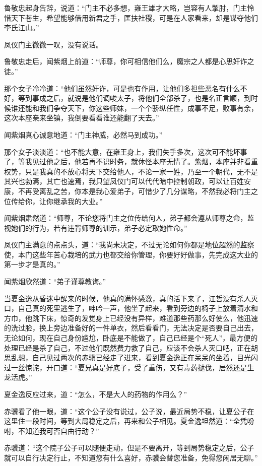 鲁敬忠起身告辞，说道：“门主不必多想，雍王雄才大略，岂容有人掣肘，门主怜惜天下苍生，希望能够借用新君之手，匡扶社稷，可是在人家看来，却是谋夺他们李氏江山。”

凤仪门主微微一叹，没有说话。

鲁敬忠走后，闻紫烟上前道：“师尊，你可相信他们么，魔宗之人都是心思奸诈之徒。”

那个女子冷冷道：“他们虽然奸诈，可是也有作用，让他们多担些恶名有什么不好，等到事成之后，就说是他们调唆太子，将他们全部杀了，也是名正言顺，到时候谁还能和我们争夺天下，你这些师妹，一个个骄纵任性，成事不足，败事有余，这次本座亲来坐镇，我倒要看看谁还能翻了天去。”

闻紫烟真心诚意地道：“门主神威，必然马到成功。”

那个女子淡淡道：“也不能大意，在雍王身上，我们失手多次，这次可不能坏事了，等我见过他之后，他若再不识时务，就休怪本座无情了。紫烟，本座并非看重权势，只是我真的不放心将天下交给他人，不论一家一姓，乃至一个朝代，无不是其兴也勃焉，其亡也速焉，我只望凤仪门可以代代暗中控制朝政，可以让百姓安康，不再受离乱之苦，你本是我心爱弟子，可惜少了几分谋略，不然我必将门主之位传给你，让你继承我的大业。”

闻紫烟肃然道：“师尊，不论您将门主之位传给何人，弟子都会遵从师尊之命，监视她们的行为，若有违背师尊的训示，弟子必定取她性命。”

凤仪门主满意的点点头，道：“我尚未决定，不过无论如何你都是地位超然的监察使，本门这些年苦心栽培的武力也都交给你管理，你要好好做事，先完成这大业的第一步才是真的。”

闻紫烟欣然道：“弟子谨尊教诲。”

当夏金逸从昏迷中醒来的时候，他真的满怀感激，真的活下来了，江哲没有杀人灭口，自己真的死里逃生了，呻吟一声，他坐了起来，看到旁边的椅子上放着清水和方巾，他跳下床，惊奇的发觉身上已经没有异样，难道那些药那么好使么，他迅速的洗过脸，换上旁边准备好的一件单衣，然后看看门，无法决定是否要自己出去，无论如何，现在自己身份尴尬，卧底是不能做了，自己已经是个“死人”，最方便的处理已经是杀了自己，不过他们既然费力救了自己，应该不会杀人灭口吧，正在胡思乱想，自己见过两次的赤骥已经走了进来，看到夏金逸正在呆呆的坐着，目光闪过一丝惊诧，开口道：“夏兄真是好底子，受了重伤，又有毒药挞伐，居然还是生龙活虎。”

夏金逸反应过来，道：“怎么，不是大人的药物的作用么？”

赤骥看了他一眼，道：“这个公子没有说过，公子说，最近局势不稳，让夏公子在这里住一段时间，等到大局稳定之后，再来和公子相见。夏金逸坦然道：“全凭吩咐，不知道我可否自由行动？”

赤骥道：“这个院子公子可以随便走动，但是不要离开，等到局势稳定之后，公子就可以自行决定行止，不知道您有什么喜好，赤骥会替您准备，免得您闲居无聊。”

